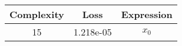 \begin{center}
        \begin{tabular}{|c|c|c|}
        \hline
        Complexity & Loss & Expression \\
        \hline
        15 & 1.218e-05 & $\begin{aligned}x_{0}\end{aligned}$\\ \hline\end{tabular}
        \end{center}
        
